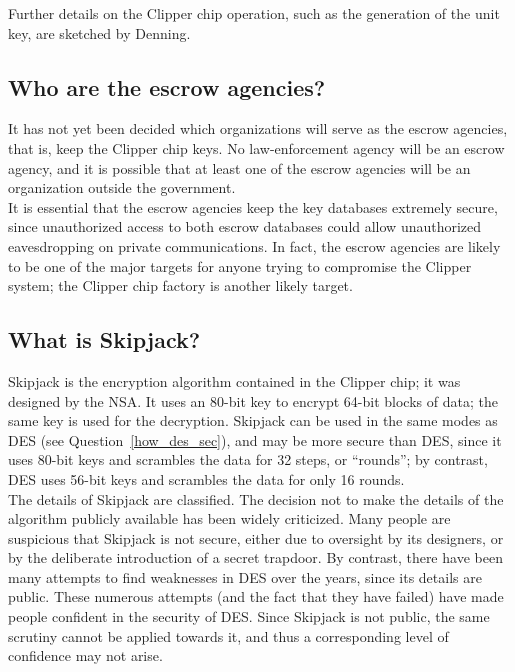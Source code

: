 Further details on the Clipper chip operation, such as the generation
of the unit key, are sketched by Denning.

\subsection{Who are the escrow agencies?}

It has not yet been decided which organizations will serve as the
escrow agencies, that is, keep the Clipper chip keys. No
law-enforcement agency will be an escrow agency, and it is possible
that at least one of the escrow agencies will be an organization
outside the government.\\

It is essential that the escrow agencies keep the key databases
extremely secure, since unauthorized access to both escrow databases
could allow unauthorized eavesdropping on private communications. In
fact, the escrow agencies are likely to be one of the major targets for
anyone trying to compromise the Clipper system; the Clipper chip
factory is another likely target.

\subsection{What is Skipjack?}
\label{what_skipj}

Skipjack is the encryption algorithm contained in the Clipper chip; it was
designed by the NSA. It uses an 80-bit key to encrypt 64-bit blocks of
data; the same key is used for the decryption. Skipjack can be used in the
same modes as DES (see Question~\ref{how_des_sec}), and may be more secure
than DES, since it uses 80-bit keys and scrambles the data for 32 steps, or
``rounds''; by contrast, DES uses 56-bit keys and scrambles the data for
only 16 rounds.\\

The details of Skipjack are classified. The decision not to make the
details of the algorithm publicly available has been widely criticized.
Many people are suspicious that Skipjack is not secure, either due to
oversight by its designers, or by the deliberate introduction of a
secret trapdoor. By contrast, there have been many attempts to find
weaknesses in DES over the years, since its details are public. These
numerous attempts (and the fact that they have failed) have made people
confident in the security of DES. Since Skipjack is not public, the
same scrutiny cannot be applied towards it, and thus a corresponding
level of confidence may not arise.\\


